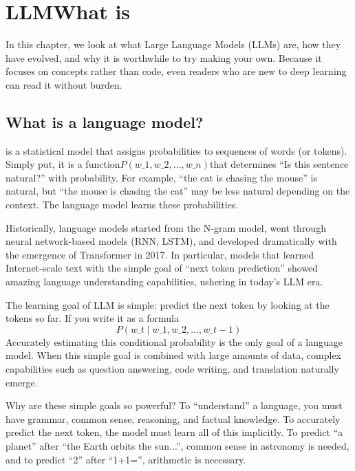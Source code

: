 \chapter{LLMWhat is}
\label{ch:intro}

In this chapter, we look at what Large Language Models (LLMs) are, how they have evolved, and why it is worthwhile to try making your own. Because it focuses on concepts rather than code, even readers who are new to deep learning can read it without burden.

\section{What is a language model?}

is a statistical model that assigns probabilities to sequences of words (or tokens). Simply put, it is a function$P(w\_1, w\_2, \dots, w\_n)$that determines ``Is this sentence natural?'' with probability. For example, ``the cat is chasing the mouse'' is natural, but ``the mouse is chasing the cat'' may be less natural depending on the context. The language model learns these probabilities.

Historically, language models started from the N-gram model, went through neural network-based models (RNN, LSTM), and developed dramatically with the emergence of Transformer in 2017. In particular, models that learned Internet-scale text with the simple goal of ``next token prediction'' showed amazing language understanding capabilities, ushering in today's LLM era.

\begin{infobox}
The learning goal of LLM is simple: predict the next token by looking at the tokens so far. If you write it as a formula
\[
P(w\_t \mid w\_1, w\_2, \dots, w\_{t-1})
\]
Accurately estimating this conditional probability is the only goal of a language model. When this simple goal is combined with large amounts of data, complex capabilities such as question answering, code writing, and translation naturally emerge.

Why are these simple goals so powerful? To ``understand'' a language, you must have grammar, common sense, reasoning, and factual knowledge. To accurately predict the next token, the model must learn all of this implicitly. To predict ``a planet'' after ``the Earth orbits the sun...'', common sense in astronomy is needed, and to predict ``2'' after ``1+1='', arithmetic is necessary.
\end{infobox}

